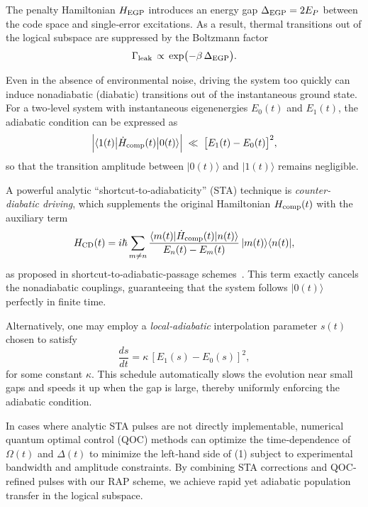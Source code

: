 \documentclass[reprint, amsmath,amssymb,nofootinbib, aps,superscriptaddress,longbibliography]{revtex4-1}
\begin{document}
The penalty Hamiltonian \(H_{\rm EGP}\) introduces an energy gap \(\Delta_{\rm EGP}=2E_P\) between the code space and single‐error excitations.  As a result, thermal transitions out of the logical subspace are suppressed by the Boltzmann factor  
\begin{equation}
\Gamma_{\rm leak}\,\propto\,\exp\bigl(-\beta\,\Delta_{\rm EGP}\bigr).
\end{equation}


Even in the absence of environmental noise, driving the system too quickly can induce nonadiabatic (diabatic) transitions out of the instantaneous ground state.  For a two‐level system with instantaneous eigenenergies \(E_0(t)\) and \(E_1(t)\), the adiabatic condition can be expressed as  
\begin{equation}
\Bigl|\langle 1(t)\bigl|\dot H_{\rm comp}(t)\bigr|0(t)\rangle\Bigr|
\;\ll\;\bigl[E_1(t)-E_0(t)\bigr]^2,
\end{equation}
so that the transition amplitude between \(\lvert0(t)\rangle\) and \(\lvert1(t)\rangle\) remains negligible.

A powerful analytic “shortcut‐to‐adiabaticity” (STA) technique is \emph{counter‐diabatic driving}, which supplements the original Hamiltonian \(H_{\rm comp}(t)\) with the auxiliary term  
\begin{equation}
H_{\rm CD}(t)
= i\hbar\sum_{m\neq n}
\frac{\langle m(t)|\dot H_{\rm comp}(t)|n(t)\rangle}{E_n(t)-E_m(t)}
\,\lvert m(t)\rangle\langle n(t)\rvert,
\end{equation}
as proposed in shortcut‐to‐adiabatic‐passage schemes~\cite{chen2010shortcuts}.  This term exactly cancels the nonadiabatic couplings, guaranteeing that the system follows \(\lvert0(t)\rangle\) perfectly in finite time.

Alternatively, one may employ a \emph{local‐adiabatic} interpolation parameter \(s(t)\) chosen to satisfy  
\begin{equation}
\frac{ds}{dt}
= \kappa\,[E_1(s)-E_0(s)]^2,
\end{equation}
for some constant \(\kappa\).  This schedule automatically slows the evolution near small gaps and speeds it up when the gap is large, thereby uniformly enforcing the adiabatic condition.

In cases where analytic STA pulses are not directly implementable, numerical quantum optimal control (QOC) methods can optimize the time‐dependence of \(\Omega(t)\) and \(\Delta(t)\) to minimize the left‐hand side of (1) subject to experimental bandwidth and amplitude constraints.  By combining STA corrections and QOC‐refined pulses with our RAP scheme, we achieve rapid yet adiabatic population transfer in the logical subspace.  
\end{document}
